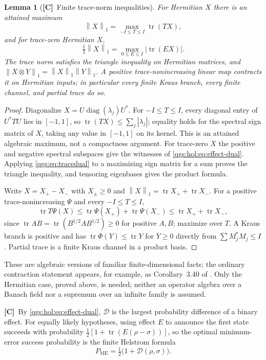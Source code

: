 \documentclass[11pt,oneside]{article}
\numberwithin{equation}{section}
\theoremstyle{plain}
\newtheorem{lemma}[lemma]{Lemma}
\theoremstyle{definition}
\theoremstyle{remark}
\newcommand{\TD}{\mathcal D}
\DeclareMathOperator{\tr}{tr}
\DeclareMathOperator{\diag}{diag}
\newcommand{\abs}[1]{\left|#1\right|}
\newcommand{\norm}[1]{\left\|#1\right\|}
\newcommand{\TC}{\textcolor{TierC}{\textsf{\bfseries[C]}}}
\begin{document}
\begin{lemma}[\TC\ Finite trace-norm inequalities]\label{qgs:lem:tracenorm}
For Hermitian $X$ there is an attained maximum
\begin{equation}\label{qgs:eq:tracedual}
 \norm{X}_1=\max_{-I\le T\le I}\tr(TX),
\end{equation}
and for trace-zero Hermitian $X$,
\begin{equation}\label{qgs:hol:eq:effect-dual}
 \tfrac12\norm{X}_1=\max_{0\le E\le I}\abs{\tr(EX)}.
\end{equation}
The trace norm satisfies the triangle inequality on Hermitian matrices, and $\norm{X\otimes Y}_1=\norm{X}_1\norm{Y}_1$. A positive trace-nonincreasing linear map contracts it on Hermitian inputs; in particular every finite Kraus branch, every finite channel, and partial trace do so.
\end{lemma}
\begin{proof}
Diagonalize $X=U\diag(\lambda_j)U^*$. For $-I\le T\le I$, every diagonal entry of $U^*TU$ lies in $[-1,1]$, so $\tr(TX)\le\sum_j\abs{\lambda_j}$; equality holds for the spectral sign matrix of $X$, taking any value in $[-1,1]$ on its kernel. This is an attained algebraic maximum, not a compactness argument. For trace-zero $X$ the positive and negative spectral subspaces give the witnesses of \eqref{qgs:hol:eq:effect-dual}. Applying \eqref{qgs:eq:tracedual} to a maximizing sign matrix for a sum proves the triangle inequality, and tensoring eigenbases gives the product formula.

Write $X=X_+-X_-$ with $X_\pm\ge0$ and $\norm{X}_1=\tr X_++\tr X_-$. For a positive trace-nonincreasing $\Psi$ and every $-I\le T\le I$,
\[
 \tr T\Psi(X)\le\tr\Psi(X_+)+\tr\Psi(X_-)\le\tr X_++\tr X_-,
\]
since $\tr AB=\tr(B^{1/2}AB^{1/2})\ge0$ for positive $A,B$; maximize over $T$. A Kraus branch is positive and has $\tr\Phi(Y)\le\tr Y$ for $Y\ge0$ directly from $\sum M_j^*M_j\le I$. Partial trace is a finite Kraus channel in a product basis.
\end{proof}

These are algebraic versions of familiar finite-dimensional facts; the ordinary contraction statement appears, for example, as Corollary~3.40 of \cite{Watrous}. Only the Hermitian case, proved above, is needed; neither an operator algebra over a Banach field nor a supremum over an infinite family is assumed.

\TC\ By \eqref{qgs:hol:eq:effect-dual}, $\TD$ is the largest probability difference of a binary effect. For equally likely hypotheses, using effect $E$ to announce the first state succeeds with probability $\tfrac12[1+\tr(E(\rho-\sigma))]$, so the optimal minimum-error success probability is the finite Helstrom formula
\begin{equation}\label{qgs:hol:eq:helstrom}
 P_{\mathrm{ME}}=\tfrac12\bigl(1+\TD(\rho,\sigma)\bigr).
\end{equation}
\end{document}
